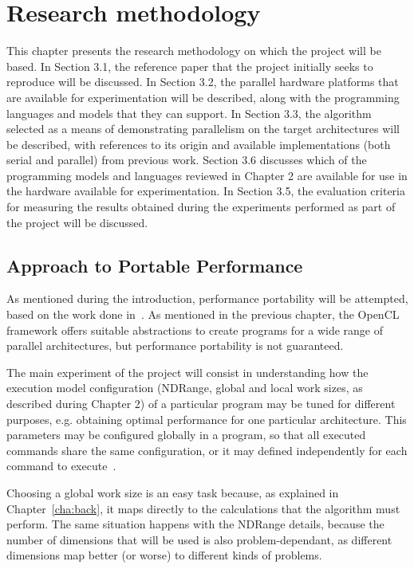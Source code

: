 \chapter{Research methodology}
\label{cha:methodology}

This chapter presents the research methodology on which the project will be based. In Section 3.1, the reference paper that the project initially seeks to reproduce will be discussed. In Section 3.2, the parallel hardware platforms that are available for experimentation will be described, along with the programming languages and models that they can support. In Section 3.3, the algorithm selected as a means of demonstrating parallelism on the target architectures will be described, with references to its origin and available implementations (both serial and parallel) from previous work. Section 3.6 discusses which of the programming models and languages reviewed in Chapter 2 are available for use in the hardware available for experimentation. In Section 3.5, the evaluation criteria for measuring the results obtained during the experiments performed as part of the project will be discussed.

\section{Approach to Portable Performance}

As mentioned during the introduction, performance portability will be attempted, based on the work done in~\cite{dolbeau2013one}. As mentioned in the previous chapter, the OpenCL framework offers suitable abstractions to create programs for a wide range of parallel architectures, but performance portability is not guaranteed.

The main experiment of the project will consist in understanding how the execution model configuration (NDRange, global and local work sizes, as described during Chapter 2) of a particular program may be tuned for different purposes, e.g. obtaining optimal performance for one particular architecture. This parameters may be configured globally in a program, so that all executed commands share the same configuration, or it may defined independently for each command to execute~\cite{khronos44opencl}.

Choosing a global work size is an easy task because, as explained in Chapter~\ref{cha:back}, it maps directly to the calculations that the algorithm must perform. The same situation happens with the NDRange details, because the number of dimensions that will be used is also problem-dependant, as different dimensions map better (or worse) to different kinds of problems.

